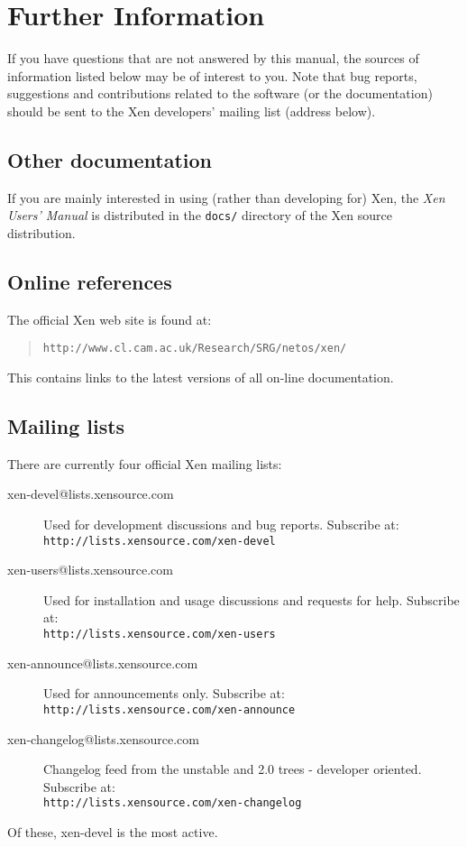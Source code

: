\chapter{Further Information}

If you have questions that are not answered by this manual, the
sources of information listed below may be of interest to you.  Note
that bug reports, suggestions and contributions related to the
software (or the documentation) should be sent to the Xen developers'
mailing list (address below).


\section{Other documentation}

If you are mainly interested in using (rather than developing for)
Xen, the \emph{Xen Users' Manual} is distributed in the {\tt docs/}
directory of the Xen source distribution.



\section{Online references}

The official Xen web site is found at:
\begin{quote}
{\tt http://www.cl.cam.ac.uk/Research/SRG/netos/xen/}
\end{quote}

This contains links to the latest versions of all on-line
documentation.


\section{Mailing lists}

There are currently four official Xen mailing lists:

\begin{description}
\item[xen-devel@lists.xensource.com] Used for development
  discussions and bug reports.  Subscribe at: \\
  {\small {\tt http://lists.xensource.com/xen-devel}}
\item[xen-users@lists.xensource.com] Used for installation and usage
  discussions and requests for help.  Subscribe at: \\
  {\small {\tt http://lists.xensource.com/xen-users}}
\item[xen-announce@lists.xensource.com] Used for announcements only.
  Subscribe at: \\
  {\small {\tt http://lists.xensource.com/xen-announce}}
\item[xen-changelog@lists.xensource.com] Changelog feed
  from the unstable and 2.0 trees - developer oriented.  Subscribe at: \\
  {\small {\tt http://lists.xensource.com/xen-changelog}}
\end{description}

Of these, xen-devel is the most active.
